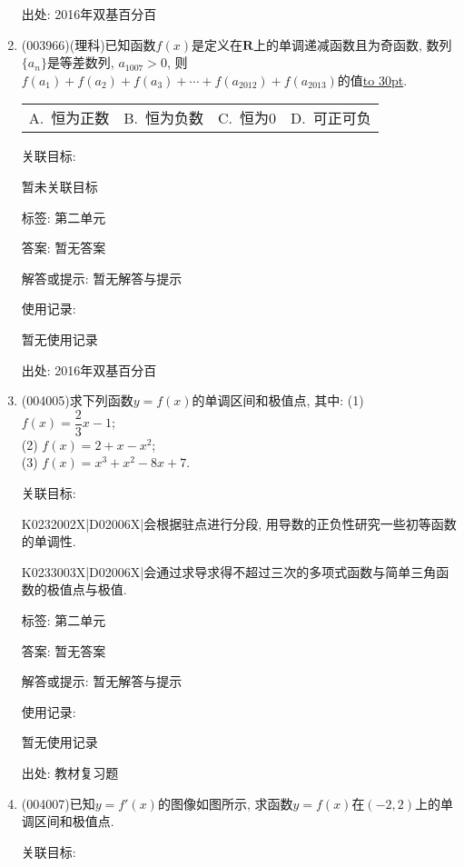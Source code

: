 \documentclass[10pt,a4paper]{article}
\newcommand{\blank}[1]{\underline{\hbox to #1pt{}}}
\newcommand{\fourch}[4]{\par\begin{tabular}{p{.23\textwidth}p{.23\textwidth}p{.23\textwidth}p{.23\textwidth}}
A.~#1 &B.~#2& C.~#3& D.~#4
\end{tabular}}
\begin{document}
\begin{enumerate}[1.]
出处: 2016年双基百分百
\item { (003966)}(理科)已知函数$f(x)$是定义在$\mathbf{R}$上的单调递减函数且为奇函数, 数列$\{a_n\}$是等差数列, $a_{1007}>0$, 则$f(a_1)+f(a_2)+f(a_3)+\cdots+f(a_{2012})+f(a_{2013})$的值\blank{30}.
\fourch{恒为正数}{恒为负数}{恒为$0$}{可正可负}


关联目标:

暂未关联目标



标签: 第二单元

答案: 暂无答案

解答或提示: 暂无解答与提示

使用记录:

暂无使用记录


出处: 2016年双基百分百
\item { (004005)}求下列函数$y=f(x)$的单调区间和极值点, 其中:
(1) $f(x)=\dfrac 23 x-1$;\\
(2) $f(x)=2+x-x^2$;\\
(3) $f(x)=x^3+x^2-8x+7$.


关联目标:

K0232002X|D02006X|会根据驻点进行分段, 用导数的正负性研究一些初等函数的单调性.

K0233003X|D02006X|会通过求导求得不超过三次的多项式函数与简单三角函数的极值点与极值.



标签: 第二单元

答案: 暂无答案

解答或提示: 暂无解答与提示

使用记录:

暂无使用记录


出处: 教材复习题
\item { (004007)}已知$y=f'(x)$的图像如图所示, 求函数$y=f(x)$在$(-2,2)$上的单调区间和极值点.
\begin{center}
\end{center}


关联目标:


\end{enumerate}
\end{document}

